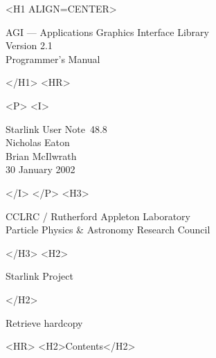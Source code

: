 \documentclass[twoside,11pt]{article}
\newcommand{\stardoccategory}  {Starlink User Note}
\newcommand{\stardocsource}    {sun\stardocnumber}
\newcommand{\stardocnumber}    {48.8}
\newcommand{\stardocauthors}   {Nicholas Eaton\\Brian McIlwrath}
\newcommand{\stardocdate}      {30 January 2002}
\newcommand{\stardoctitle}     {AGI --- Applications Graphics Interface
                                Library}
\newcommand{\stardocversion}   {Version 2.1}
\newcommand{\stardocmanual}    {Programmer's Manual}
\newcommand{\htmladdnormallink}[2]{#1}
\newcommand{\htmladdimg}[1]{}
\newcommand{\htmlref}[2]{#1}
\newcommand{\htmladdtonavigation}[1]{}
\newcommand{\xlabel}[1]{}
\renewcommand{\_}{\texttt{\symbol{95}}}
\begin{document}
\begin{htmlonly}
   \xlabel{}
   \begin{rawhtml} <H1 ALIGN=CENTER> \end{rawhtml}
      \stardoctitle\\
      \stardocversion\\
      \stardocmanual
   \begin{rawhtml} </H1> <HR> \end{rawhtml}


   \begin{rawhtml} <P> <I> \end{rawhtml}
   \stardoccategory\ \stardocnumber \\
   \stardocauthors \\
   \stardocdate
   \begin{rawhtml} </I> </P> <H3> \end{rawhtml}
      \htmladdnormallink{CCLRC}{http://www.cclrc.ac.uk} /
      \htmladdnormallink{Rutherford Appleton Laboratory}
                        {http://www.cclrc.ac.uk/ral} \\
      \htmladdnormallink{Particle Physics \& Astronomy Research Council}
                        {http://www.pparc.ac.uk} \\
   \begin{rawhtml} </H3> <H2> \end{rawhtml}
      \htmladdnormallink{Starlink Project}{http://www.starlink.ac.uk/}
   \begin{rawhtml} </H2> \end{rawhtml}
   \htmladdnormallink{\htmladdimg{source.gif} Retrieve hardcopy}
      {http://www.starlink.ac.uk/cgi-bin/hcserver?\stardocsource}\\

  \label{stardoccontents}
  \begin{rawhtml} 
    <HR>
    <H2>Contents</H2>
  \end{rawhtml}
  \htmladdtonavigation{\htmlref{\htmladdimg{contents_motif.gif}}
        {stardoccontents}}

\end{htmlonly}
\end{document}
